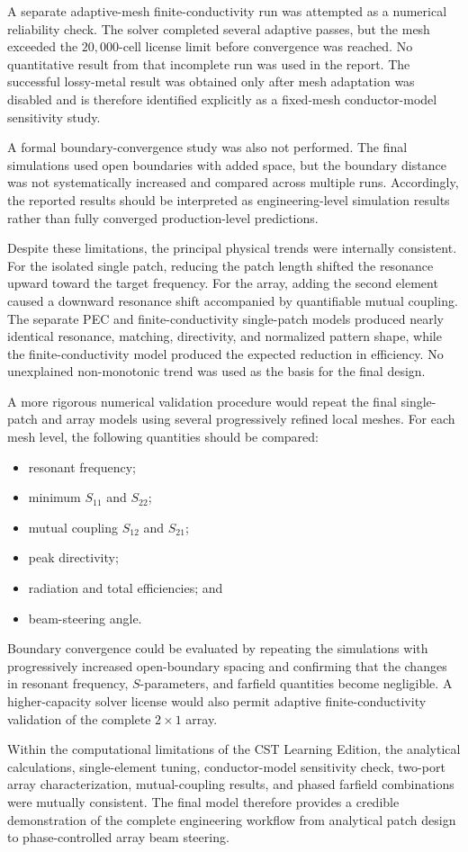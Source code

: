 A separate adaptive-mesh finite-conductivity run was attempted as a numerical reliability check. The
solver completed several adaptive passes, but the mesh exceeded the \(20{,}000\)-cell license limit
before convergence was reached. No quantitative result from that incomplete run was used in the
report. The successful lossy-metal result was obtained only after mesh adaptation was disabled and is
therefore identified explicitly as a fixed-mesh conductor-model sensitivity study.

A formal boundary-convergence study was also not performed. The final simulations used open
boundaries with added space, but the boundary distance was not systematically increased and compared
across multiple runs. Accordingly, the reported results should be interpreted as engineering-level
simulation results rather than fully converged production-level predictions.

Despite these limitations, the principal physical trends were internally consistent. For the isolated
single patch, reducing the patch length shifted the resonance upward toward the target frequency. For
the array, adding the second element caused a downward resonance shift accompanied by quantifiable
mutual coupling. The separate PEC and finite-conductivity single-patch models produced nearly
identical resonance, matching, directivity, and normalized pattern shape, while the finite-conductivity
model produced the expected reduction in efficiency. No unexplained non-monotonic trend was used as
the basis for the final design.

A more rigorous numerical validation procedure would repeat the final single-patch and array models
using several progressively refined local meshes. For each mesh level, the following quantities should
be compared:
\begin{itemize}
    \item resonant frequency;
    \item minimum \(S_{11}\) and \(S_{22}\);
    \item mutual coupling \(S_{12}\) and \(S_{21}\);
    \item peak directivity;
    \item radiation and total efficiencies; and
    \item beam-steering angle.
\end{itemize}

Boundary convergence could be evaluated by repeating the simulations with progressively increased
open-boundary spacing and confirming that the changes in resonant frequency, \(S\)-parameters, and
farfield quantities become negligible. A higher-capacity solver license would also permit adaptive
finite-conductivity validation of the complete \(2\times1\) array.

Within the computational limitations of the CST Learning Edition, the analytical calculations,
single-element tuning, conductor-model sensitivity check, two-port array characterization,
mutual-coupling results, and phased farfield combinations were mutually consistent. The final model
therefore provides a credible demonstration of the complete engineering workflow from analytical patch
design to phase-controlled array beam steering.
